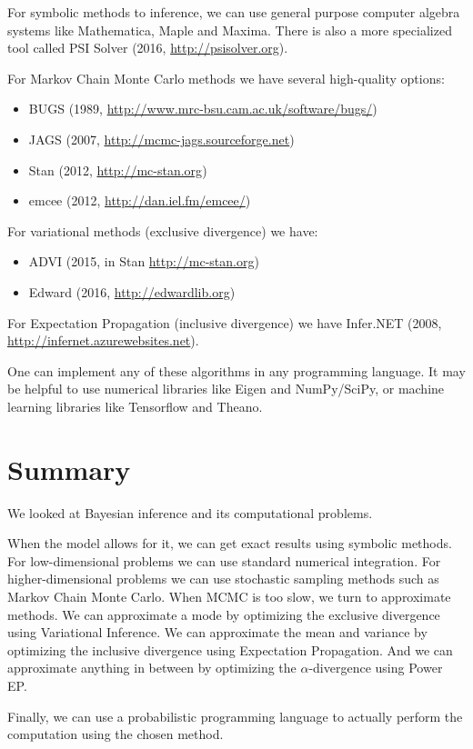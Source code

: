 \documentclass[12pt,vu]{adammath}
\theoremstyle{plain}
\theoremstyle{definition}
\theoremstyle{remark}
\begin{document}
For symbolic methods to inference, we can use general purpose computer algebra systems like Mathematica, Maple and Maxima.
There is also a more specialized tool called PSI Solver (2016, \url{http://psisolver.org}).

For Markov Chain Monte Carlo methods we have several high-quality options:
\begin{itemize}
\item BUGS (1989, \url{http://www.mrc-bsu.cam.ac.uk/software/bugs/})
\item JAGS (2007, \url{http://mcmc-jags.sourceforge.net})
\item Stan (2012, \url{http://mc-stan.org})
\item emcee (2012, \url{http://dan.iel.fm/emcee/})
\end{itemize}

For variational methods (exclusive divergence) we have:
\begin{itemize}
\item ADVI (2015, in Stan \url{http://mc-stan.org})
\item Edward (2016, \url{http://edwardlib.org})
\end{itemize}

For Expectation Propagation (inclusive divergence) we have Infer.NET (2008, \url{http://infernet.azurewebsites.net}).

One can implement any of these algorithms in any programming language.
It may be helpful to use numerical libraries like Eigen and NumPy/SciPy, or machine learning libraries like Tensorflow and Theano.

\chapter{Summary}
We looked at Bayesian inference and its computational problems.

When the model allows for it, we can get exact results using symbolic methods.
For low-dimensional problems we can use standard numerical integration.
For higher-dimensional problems we can use stochastic sampling methods such as Markov Chain Monte Carlo.
When MCMC is too slow, we turn to approximate methods.
We can approximate a mode by optimizing the exclusive divergence using Variational Inference.
We can approximate the mean and variance by optimizing the inclusive divergence using Expectation Propagation.
And we can approximate anything in between by optimizing the $\alpha$-divergence using Power EP.

Finally, we can use a probabilistic programming language to actually perform the computation using the chosen method.
\end{document}
